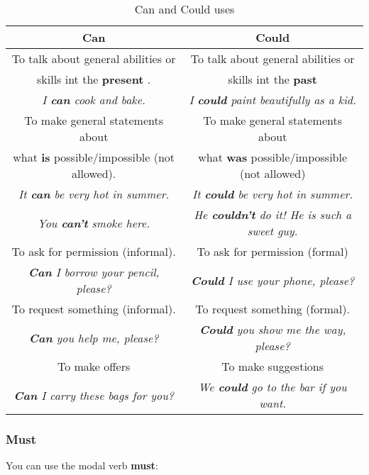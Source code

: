 \documentclass[hidelinks,10pt,a4paper]{article}
\begin{document}
\begin{table}[h]
\begin{center}
\begin{tabular}{|c|c|}
	\hline
	\textbf{Can} & \textbf{Could} \\ \hline
	To talk about general abilities or & To talk about general abilities or \\
	skills int the \textbf{present} . & skills int the \textbf{past} \\
	\textit{I \textbf{can} cook and bake.} & \textit{I \textbf{could} paint beautifully as a kid.} \\ \hline
	To make general statements about & To make general statements about \\
	what \textbf{is} possible/impossible (not allowed). & what \textbf{was} possible/impossible (not allowed) \\
	\textit{It \textbf{can} be very hot in summer.} & \textit{It \textbf{could} be very hot in summer.} \\
	\textit{You \textbf{can't} smoke here.} & \textit{He \textbf{couldn't} do it! He is such a sweet guy.} \\ \hline
	To ask for permission (informal). & To ask for permission (formal) \\
	\textit{\textbf{Can} I borrow your pencil, please?} & \textit{\textbf{Could} I use your phone, please?} \\ \hline
	To request something (informal). & To request something (formal). \\
	\textit{\textbf{Can} you help me, please?} & \textit{\textbf{Could} you show me the way, please?} \\ \hline
	To make offers & To make suggestions \\
	\textit{\textbf{Can} I carry these bags for you?} & \textit{We \textbf{could} go to the bar if you want.} \\ \hline
\end{tabular}
\end{center}
\caption{Can and Could uses} \label{tab:cancould1}
\end{table}

\subsubsection{Must}
You can use the modal verb \textbf{must}:
\end{document}
